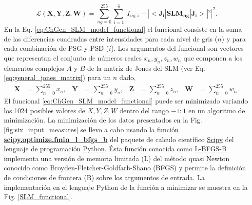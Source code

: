 \begin{equation}
\mathcal{L}(\mathbf{X,Y,Z,W}) = \sum_{ng=0}^{255}\sum_{i=1}^6 | I_{ng,i} -
|<\mathbf{J_{i}}|\mathbf{SLM_{ng}}|\mathbf{J_{i}}>|^2|^2.
\label{eq:ChGen_SLM_model_functional}  
\end{equation}
En la Eq. \ref{eq:ChGen_SLM_model_functional} el funcional consiste en
la suma de las diferencias cuadradas entre intensidades para cada
nivel de gris ($n$) y para cada combinación de PSG y PSD ($i$). Los
argumentos del funcional son vectores que representan el conjunto de números
reales $x_n, y_n, z_n, w_n$ que componen a los elementos complejos $A$ y $B$
de la matriz de Jones del SLM (ver 
Eq. \ref{eq:general_jones_matrix}) para un $n$ dado,
\begin{align*}
\mathbf{X} &= \sum_{n=0}^{255}x_n,&\mathbf{Y} &= \sum_{n=0}^{255}y_n,&\mathbf{Z} &= \sum_{n=0}^{255}z_n,&\mathbf{W} &= \sum_{n=0}^{255}w_n.
\end{align*} 
El funcional \ref{eq:ChGen_SLM_model_functional}  puede ser minimizado
variando los 1024 posibles valores 
de $X,Y,Z,W$ dentro del rango $-1:1$ en un algoritmo de
minimización. La minimización de los datos presentados en la
Fig. \ref{fig:six_input_measures} se llevo a cabo usando la función
 \href{http://goo.gl/tv5Iyz}{\bf{scipy.optimize.fmin\_l\_bfgs\_b}} del
 paquete de calculo científico \href{http://goo.gl/fRhz8s}{Scipy} del
 lenguaje de programación \href{https://www.python.org}{Python}. Ésta
 función conocida como \href{http://en.wikipedia.org/wiki/Limited-memory\_BFGS}{L-BFGS-B} implementa una versión de memoria limitada (L) del método quasi
 Newton conocido como Broyden-Fletcher-Goldfarb-Shano (BFGS) y permite
 la definición de condiciones de frontera (B) sobre los argumentos de
 entrada.  
La implementación en el lenguaje Python de la función a minimizar se
muestra en la Fig. \ref{SLM_functional}. 
